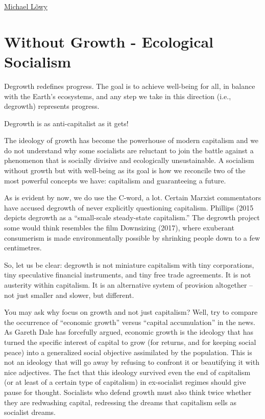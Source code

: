 \documentclass[
]{book}
\begin{document}
\href{https://www.letusrise.ie/rupture-articles/2wl71srdonxrbgxal9v6bv78njr2fb}{Michael Lõwy}

\hypertarget{without-growth---ecological-socialism}{%
\section{Without Growth - Ecological Socialism}\label{without-growth---ecological-socialism}}

Degrowth redefines progress.
The goal is to achieve well-being for all,
in balance with the Earth's ecosystems,
and any step we take in this direction (i.e., degrowth) represents progress.

Degrowth is as anti-capitalist as it gets!

The ideology of growth has become the powerhouse of modern capitalism and we do not understand why some socialists are reluctant to join the battle against a phenomenon that is socially divisive and ecologically unsustainable. A socialism without growth but with well-being as its goal is how we reconcile two of the most powerful concepts we have: capitalism and guaranteeing a future.

As is evident by now, we do use the C-word, a lot. Certain Marxist commentators have accused degrowth of never explicitly questioning capitalism. Phillips (2015 depicts degrowth as a ``small-scale steady-state capitalism.'' The degrowth project some would think resembles the film Downsizing (2017), where exuberant consumerism is made environmentally possible by shrinking people down to a few centimetres.

So, let us be clear: degrowth is not miniature capitalism with tiny corporations, tiny speculative financial instruments, and tiny free trade agreements. It is not austerity within capitalism. It is an alternative system of provision altogether -- not just smaller and slower, but different.

You may ask why focus on growth and not just capitalism? Well, try to compare the occurrence of ``economic growth'' versus ``capital accumulation'' in the news. As Gareth Dale has forcefully argued, economic growth is the ideology that has turned the specific interest of capital to grow (for returns, and for keeping social peace) into a generalized social objective assimilated by the population. This is not an ideology that will go away by refusing to confront it or beautifying it with nice adjectives. The fact that this ideology survived even the end of capitalism (or at least of a certain type of capitalism) in ex-socialist regimes should give pause for thought. Socialists who defend growth must also think twice whether they are redwashing capital, redressing the dreams that capitalism sells as socialist dreams.
\end{document}
